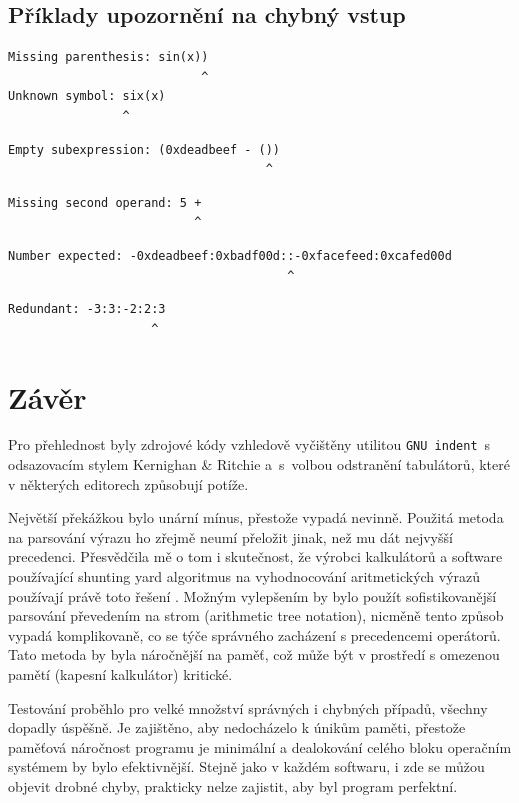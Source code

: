 \documentclass[11pt]{article}
\begin{document}
\subsection{Příklady upozornění na chybný vstup}
\begin{verbatim}
Missing parenthesis: sin(x))
                           ^
Unknown symbol: six(x)
                ^
\end{verbatim}
\begin{verbatim}
Empty subexpression: (0xdeadbeef - ())
                                    ^
\end{verbatim}
\begin{verbatim}
Missing second operand: 5 +
                          ^
\end{verbatim}
\begin{verbatim}
Number expected: -0xdeadbeef:0xbadf00d::-0xfacefeed:0xcafed00d
                                       ^
\end{verbatim}
\begin{verbatim}
Redundant: -3:3:-2:2:3
                    ^
\end{verbatim}


\section{Závěr}
Pro přehlednost byly zdrojové kódy vzhledově vyčištěny utilitou \texttt{GNU indent}~s
odsazovacím stylem Kernighan \& Ritchie a~s~volbou odstranění tabulátorů, které
v některých editorech způsobují potíže.

Největší překážkou bylo unární mínus, přestože vypadá nevinně. Použitá metoda
na parsování výrazu ho zřejmě neumí přeložit jinak, než mu dát nejvyšší
precedenci. Přesvědčila mě o tom i skutečnost, že výrobci kalkulátorů a
software používající shunting yard algoritmus na vyhodnocování aritmetických
výrazů používají právě toto řešení \cite{minus}. Možným vylepšením by bylo
použít sofistikovanější parsování převedením na strom (arithmetic tree
notation), nicměně tento způsob vypadá komplikovaně, co se týče správného
zacházení s precedencemi operátorů. Tato metoda by byla náročnější na paměť,
což může být v prostředí s omezenou pamětí (kapesní kalkulátor) kritické.

Testování proběhlo pro velké množství správných i chybných případů, všechny
dopadly úspěšně. Je zajištěno, aby nedocházelo k únikům paměti, přestože
paměťová náročnost programu je minimální a dealokování celého bloku operačním
systémem by bylo efektivnější.  Stejně jako v každém softwaru, i zde se můžou
objevit drobné chyby, prakticky nelze zajistit, aby byl program perfektní.
\end{document}
